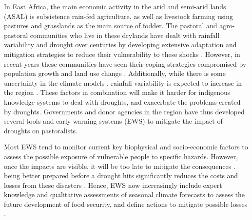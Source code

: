\documentclass[review]{elsarticle}
\begin{document}
In East Africa, the main economic activity in the arid and semi-arid lands (ASAL) is subsistence rain-fed agriculture, as well as livestock farming using pastures and grasslands as the main source of fodder. The pastoral and agro-pastoral communities who live in these drylands have dealt with rainfall variability and drought over centuries by developing extensive adaptation and mitigation strategies to reduce their vulnerability to these shocks \citep{Nyong2007,orindi2007pastoral}. However, in recent years these communities have seen their coping strategies compromised by population growth and land use change \citep{Galvin2001ImpactsOC}. Additionally, while there is some uncertainty in the climate models \citep[IPCC,][]{stocker2013climate}, rainfall variability is expected to increase in the region \citep{Tierneye1500682,yang2018brief}. These factors in combination will make it harder for indigenous knowledge systems to deal with droughts, and exacerbate the problems created by droughts.  Governments and donor agencies in the region have thus developed several tools and early warning systems (EWS) to mitigate the impact of droughts on pastoralists.


Most EWS tend to monitor current key biophysical and socio-economic factors to assess the possible exposure of vulnerable people to specific hazards. However, once the impacts are visible, it will be too late to mitigate the consequences \citep{kogan}.  being better prepared before a drought hits significantly reduces the costs and losses from these disasters \citep{venton2012economics}. Hence, EWS now increasingly include expert knowledge and qualitative assessments of seasonal climate forecasts to assess the future development of food security, and define actions to mitigate possible losses \citep{nhess-15-895-2015,TozierdelaPoterie2015}. 
\end{document}
